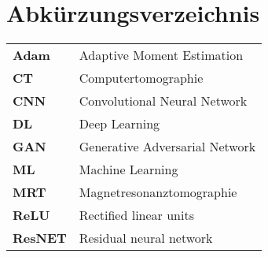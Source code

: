 
\chapter*{Abkürzungsverzeichnis}
\begin{longtable}{ll}
\textbf{Adam} & Adaptive Moment Estimation \\
\textbf{CT} & Computertomographie \\
\textbf{CNN} & Convolutional Neural Network \\
\textbf{DL} & Deep Learning \\
\textbf{GAN}  & Generative Adversarial Network \\ 
\textbf{ML} & Machine Learning\\
\textbf{MRT} & Magnetresonanztomographie \\
\textbf{ReLU} & Rectified linear units\\
\textbf{ResNET} & Residual neural network\\
\end{longtable}

\cleardoublepage
